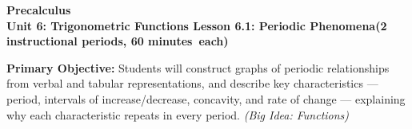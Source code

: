\documentclass[10pt]{article}
\newcommand{\CourseName}{Precalculus}
\newcommand{\MeetingLength}{60 minutes}
\newcommand{\UnitNumberName}{Unit 6: Trigonometric Functions \quad}
\newcommand{\LessonNumberName}{Lesson 6.1: Periodic Phenomena}
\begin{document}
\begin{center}
  {\Large\bfseries \CourseName} \\[4pt]
  {\small\bfseries \UnitNumberName \LessonNumberName \quad (2 instructional periods, \MeetingLength\ each)}
\end{center}

\begin{tcolorbox}[colback=sky, colframe=navy, boxrule=0.9pt, arc=2mm,
    left=2mm, right=2mm, top=1.5mm, bottom=1.5mm]
  \textbf{Primary Objective:} Students will construct graphs of periodic
  relationships from verbal and tabular representations, and describe key
  characteristics — period, intervals of increase/decrease, concavity, and
  rate of change — explaining why each characteristic repeats in every period.
  \textit{(Big Idea: Functions)}
\end{tcolorbox}

\vspace{0.08in}
\end{document}
